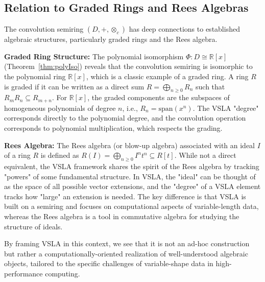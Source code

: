\subsection{Relation to Graded Rings and Rees Algebras}
The convolution semiring \((D, +, \otimes_c)\) has deep connections to established algebraic structures, particularly graded rings and the Rees algebra.

\textbf{Graded Ring Structure:}
The polynomial isomorphism \(\Phi: D \cong \mathbb{R}[x]\) (Theorem~\ref{thm:polyIso}) reveals that the convolution semiring is isomorphic to the polynomial ring \(\mathbb{R}[x]\), which is a classic example of a graded ring. A ring \(R\) is graded if it can be written as a direct sum \(R = \bigoplus_{n \ge 0} R_n\) such that \(R_m R_n \subseteq R_{m+n}\). For \(\mathbb{R}[x]\), the graded components are the subspaces of homogeneous polynomials of degree \(n\), i.e., \(R_n = \text{span}(x^n)\). The VSLA "degree" corresponds directly to the polynomial degree, and the convolution operation corresponds to polynomial multiplication, which respects the grading.

\textbf{Rees Algebra:}
The Rees algebra (or blow-up algebra) associated with an ideal \(I\) of a ring \(R\) is defined as \(R(I) = \bigoplus_{n \ge 0} I^n t^n \subseteq R[t]\). While not a direct equivalent, the VSLA framework shares the spirit of the Rees algebra by tracking "powers" of some fundamental structure. In VSLA, the "ideal" can be thought of as the space of all possible vector extensions, and the "degree" of a VSLA element tracks how "large" an extension is needed. The key difference is that VSLA is built on a semiring and focuses on computational aspects of variable-length data, whereas the Rees algebra is a tool in commutative algebra for studying the structure of ideals.

By framing VSLA in this context, we see that it is not an ad-hoc construction but rather a computationally-oriented realization of well-understood algebraic objects, tailored to the specific challenges of variable-shape data in high-performance computing.

